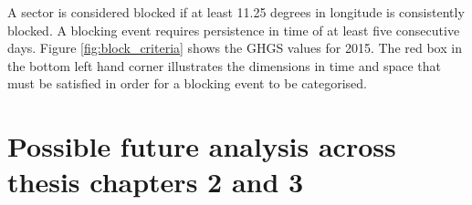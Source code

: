 

A sector is considered blocked if at least 11.25 degrees in longitude is consistently blocked. A blocking event requires persistence in time of at least five consecutive days. Figure \ref{fig:block_criteria} shows the GHGS values for 2015. The red box in the bottom left hand corner illustrates the dimensions in time and space that must be satisfied in order for a blocking event to be categorised.







\section{Possible future analysis across thesis chapters 2 and 3}


